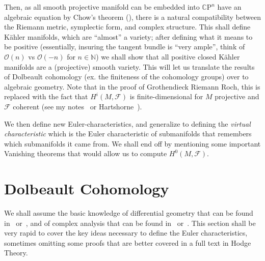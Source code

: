 \documentclass{book}
\newcommand{\N}{{\mathbb{N}}}
\newcommand{\CF}{{\mathcal{F}}}
\newcommand{\CO}{{\mathcal{O}}}
\newcommand{\CP}{{\mathbb{C}\mathrm{P}}}
\begin{document}
Then, as all smooth projective manifold can be embedded into $\CP^n$ have an algebraic equation by Chow's
theorem (\cite{hallGAGATheorems2022}), there is a natural compatibility between the Riemann metric, symplectic
form, and complex structure. This shall define K\"ahler manifolds, which are ``almost'' a variety; after
defining what it means to be positive (essentially, insuring the tangent bundle is ``very ample'', think of
$\CO(n)$ vs $\CO(-n)$ for $n \in \N$) we shall show that all positive closed K\"ahler manifolds are a
(projective) smooth variety. This will let us translate the results  of Dolbeault cohomology (ex. the
finiteness of the cohomology groups) over to algebraic geometry. Note that in the proof of Grothendieck
Riemann Roch, this is replaced with the fact that $H^i(M, \CF)$ is finite-dimensional for $M$ projective and
$\CF$ coherent (see my notes~\cite{NateAlgGeo} or Hartshorne~\cite{hartshorneAlgebraicGeometry2013}).

We then define new Euler-characteristics, and generalize to defining the \emph{virtual characteristic} which
is the Euler characteristic of submanifolds that remembers which submanifolds it came from. We shall end off by mentioning some important Vanishing theorems that would allow us to compute
$H^0(M, \CF)$.



\section{Dolbeault Cohomology}

We shall assume the basic knowledge of differential geometry that can be found in~\cite{NateDiffGeo}
or~\cite{leeIntroductionSmoothManifolds2003}, and of complex analysis that can be found
in~\cite{NateComplexAnalysis} or~\cite{ahlforsComplexAnalysisIntroduction2007}. This section shall be very
rapid to cover the key ideas necessary to define the Euler characteristics, sometimes omitting some proofs
that are better covered in a full text in Hodge Theory.
\end{document}
